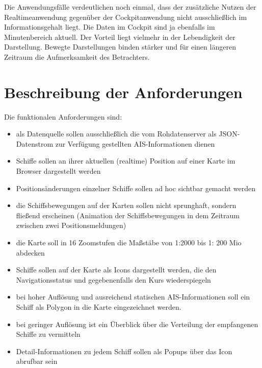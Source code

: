 Die Anwendungsfälle verdeutlichen noch einmal, dass der zusätzliche Nutzen der Realtimeanwendung gegenüber der Cockpitanwendung nicht ausschließlich im Informationsgehalt liegt. Die Daten im Cockpit sind ja ebenfalls im Minutenbereich aktuell. Der Vorteil liegt vielmehr in der Lebendigkeit der Darstellung. Bewegte Darstellungen binden stärker und für einen längeren Zeitraum die Aufmerksamkeit des Betrachters.

\section{Beschreibung der Anforderungen}\label{s.Beschreibung der Anforderungen}

Die funktionalen Anforderungen sind:
\begin{itemize}

\item als Datenquelle sollen ausschließlich die vom Rohdatenserver als JSON-Datenstrom zur Verfügung gestellten AIS-Informationen dienen
\item Schiffe sollen an ihrer aktuellen (realtime) Position auf einer Karte im Browser dargestellt werden
\item Positionsänderungen einzelner Schiffe sollen ad hoc sichtbar gemacht werden
\item die Schiffsbewegungen auf der Karten sollen nicht sprunghaft, sondern fließend erscheinen (Animation der Schiffsbewegungen in dem Zeitraum zwischen zwei Positionsmeldungen)
\item die Karte soll in 16 Zoomstufen die Maßstäbe von 1:2000 bis 1: 200 Mio abdecken
\item Schiffe sollen auf der Karte als Icons dargestellt werden, die den Navigationsstatus und gegebenenfalls den Kurs wiederspiegeln
\item bei hoher Auflösung und ausreichend statischen AIS-Informationen soll ein Schiff als Polygon in die Karte eingezeichnet werden.
\item bei geringer Auflösung ist ein Überblick über die Verteilung der empfangenen Schiffe zu vermitteln
\item Detail-Informationen zu jedem Schiff sollen als Popups über das Icon abrufbar sein
\end{itemize}

